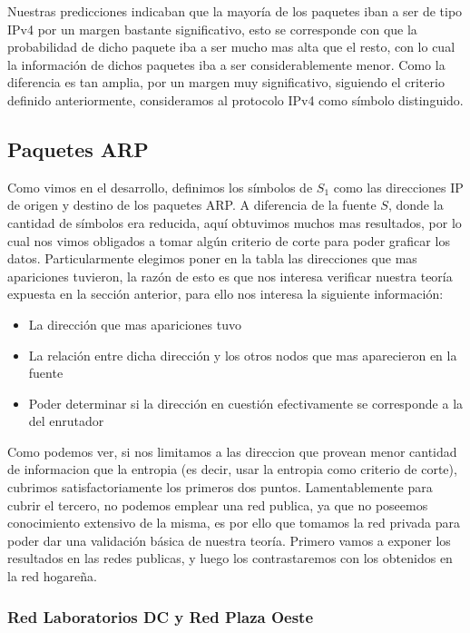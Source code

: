 Nuestras predicciones indicaban que la mayoría de los paquetes iban a ser de tipo IPv4 por un margen bastante significativo, esto se corresponde con que la probabilidad de dicho paquete iba a ser mucho mas alta que el resto, con lo cual la información de dichos paquetes iba a ser considerablemente menor. Como la diferencia es tan amplia, por un margen muy significativo, siguiendo el criterio definido anteriormente, consideramos al protocolo IPv4 como símbolo distinguido.

\pagebreak

\subsection{Paquetes ARP}

Como vimos en el desarrollo, definimos los símbolos de $S_1$ como las direcciones IP de origen y destino de los paquetes ARP. A diferencia de la fuente $S$, donde la cantidad de símbolos era reducida, aquí obtuvimos muchos mas resultados, por lo cual nos vimos obligados a tomar algún criterio de corte para poder graficar los datos. Particularmente elegimos poner en la tabla las direcciones que mas apariciones tuvieron, la razón de esto es que nos interesa verificar nuestra teoría expuesta en la sección anterior, para ello nos interesa la siguiente información:

\begin{itemize}
	\item La dirección que mas apariciones tuvo
	\item La relación entre dicha dirección y los otros nodos que mas aparecieron en la fuente
	\item Poder determinar si la dirección en cuestión efectivamente se corresponde a la del enrutador
\end{itemize}

Como podemos ver, si nos limitamos a las direccion que provean menor cantidad de informacion que la entropia (es decir, usar la entropia como criterio de corte), cubrimos satisfactoriamente los primeros dos puntos. Lamentablemente para cubrir el tercero, no podemos emplear una red publica, ya que no poseemos conocimiento extensivo de la misma, es por ello que tomamos la red privada para poder dar una validación básica de nuestra teoría. Primero vamos a exponer los resultados en las redes publicas, y luego los contrastaremos con los obtenidos en la red hogareña.


\subsubsection{Red Laboratorios DC y Red Plaza Oeste}


